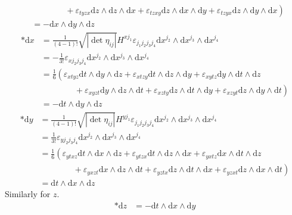 \documentclass[12pt,a4]{article}
\newcommand{\e}{\mathrm{d}}
\begin{document}
\begin{enumerate}
\begin{enumerate}
\begin{align*}
                 &\qquad \qquad +\left. \varepsilon_{t y z x} \e z \wedge \e z \wedge \e x + \varepsilon_{t z x y} \e z \wedge \e x \wedge \e y + \varepsilon_{t z y x} \e z \wedge \e y \wedge \e x\right)\\
                 &= -  \e x \wedge \e y \wedge \e z
        \end{align*}
        \begin{align*}
          *\e x
                 &= \frac{1}{(4 - 1)!} \sqrt{|\det{\eta_{ij}}|} H^{x j_1} \varepsilon_{j_1 j_2 j_3 j_4} \e x^{j_2} \wedge \e x^{j_3} \wedge \e x^{j_4}\\
                 &= - \frac{1}{3!}  \varepsilon_{x j_2 j_3 j_4} \e x^{j_2} \wedge \e x^{j_3} \wedge \e x^{j_4}\\
                 &= \frac{1}{6}  \left(\varepsilon_{x t y z} \e t \wedge \e y \wedge \e z + \varepsilon_{x t z y} \e t \wedge \e z \wedge \e y + \varepsilon_{x y t z} \e y \wedge \e t \wedge \e z\right.\\
                 &\qquad \qquad +\left. \varepsilon_{x y z t} \e y \wedge \e z \wedge \e t + \varepsilon_{x z t y} \e z \wedge \e t \wedge \e y + \varepsilon_{x z y t} \e z \wedge \e y \wedge \e t\right)\\
                 &= -  \e t \wedge \e y \wedge \e z
        \end{align*}
        \begin{align*}
          *\e y
                 &= \frac{1}{(4 - 1)!} \sqrt{|\det{\eta_{ij}}|} H^{y j_1} \varepsilon_{j_1 j_2 j_3 j_4} \e x^{j_2} \wedge \e x^{j_3} \wedge \e x^{j_4}\\
                 &= \frac{1}{3!}  \varepsilon_{y j_2 j_3 j_4} \e x^{j_2} \wedge \e x^{j_3} \wedge \e x^{j_4}\\
                 &= \frac{1}{6}  \left(\varepsilon_{y t x z} \e t \wedge \e x \wedge \e z + \varepsilon_{y t z x} \e t \wedge \e z \wedge \e x + \varepsilon_{y x t z} \e x \wedge \e t \wedge \e z\right.\\
                 &\qquad \qquad +\left. \varepsilon_{y x z t} \e x \wedge \e z \wedge \e t + \varepsilon_{y z t x} \e z \wedge \e t \wedge \e x + \varepsilon_{y z x t} \e z \wedge \e x \wedge \e t\right)\\
                 &=  \e t \wedge \e x \wedge \e z
        \end{align*}
        Similarly for $z$.
        \begin{align*}
          *\e z
                 &=  - \e t \wedge \e x \wedge \e y
        \end{align*}

\end{enumerate}
\end{enumerate}
\end{document}
